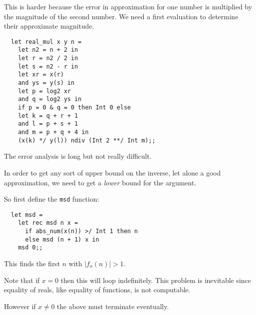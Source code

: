 \begin{slide*}


\vspace*{0.5cm}

This is harder because the error in approximation for one number is multiplied
by the magnitude of the second number. We need a first evaluation to determine
their approximate magnitude.

\begin{black}\begin{verbatim}
  let real_mul x y n =
    let n2 = n + 2 in
    let r = n2 / 2 in
    let s = n2 - r in
    let xr = x(r)
    and ys = y(s) in
    let p = log2 xr
    and q = log2 ys in
    if p = 0 & q = 0 then Int 0 else
    let k = q + r + 1
    and l = p + s + 1
    and m = p + q + 4 in
    (x(k) */ y(l)) ndiv (Int 2 **/ Int m);;
\end{verbatim}\end{black}

The error analysis is long but not really difficult.

\end{slide*}





\begin{slide*}


\vspace*{0.5cm}

In order to get any sort of upper bound on the inverse, let alone a good
approximation, we need to get a {\em lower} bound for the argument.

So first define the {\black \tt msd} function:

\begin{black}\begin{verbatim}
  let msd =
    let rec msd n x =
      if abs_num(x(n)) >/ Int 1 then n
      else msd (n + 1) x in
    msd 0;;
\end{verbatim}\end{black}

This finds the first {\red $n$} with {\red $|f_x(n) | > 1$}.

Note that if {\red $x = 0$} then this will loop indefinitely. This problem is
inevitable since equality of reals, like equality of functions, is not
computable.

However if {\red $x \not= 0$} the above must terminate eventually.

\end{slide*}



